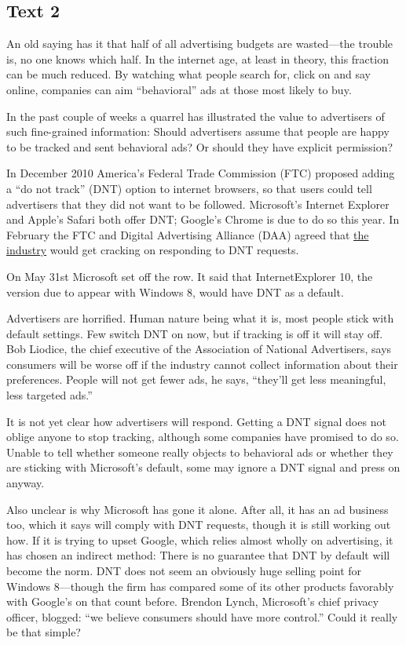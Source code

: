 \newpage
\subsection{Text 2}


An old saying has it that half of all advertising budgets are
wasted---the trouble is, no one knows which half. In the internet age,
at least in theory, this fraction can be much reduced. By watching what
people search for, click on and say online, companies can aim
``behavioral'' ads at those most likely to buy.

In the past couple of weeks a quarrel has illustrated the value to
advertisers of such fine-grained information: Should advertisers assume
that people are happy to be tracked and sent behavioral ads? Or should
they have explicit permission?

In December 2010 America's Federal Trade Commission (FTC) proposed
adding a ``do not track'' (DNT) option to internet browsers, so that
users could tell advertisers that they did not want to be followed.
Microsoft's Internet Explorer and Apple's Safari both offer DNT;
Google's Chrome is due to do so this year. In February the FTC and
Digital Advertising Alliance (DAA) agreed that \uline{the
	industry} would get cracking on responding to DNT requests.

On May 31st Microsoft set off the row. It said that InternetExplorer 10,
the version due to appear with Windows 8, would have DNT as a default.

Advertisers are horrified. Human nature being what it is, most people
stick with default settings. Few switch DNT on now, but if tracking is
off it will stay off. Bob Liodice, the chief executive of the
Association of National Advertisers, says consumers will be worse off if
the industry cannot collect information about their preferences. People
will not get fewer ads, he says, ``they'll get less meaningful, less
targeted ads.''

It is not yet clear how advertisers will respond. Getting a DNT signal
does not oblige anyone to stop tracking, although some companies have
promised to do so. Unable to tell whether someone really objects to
behavioral ads or whether they are sticking with Microsoft's default,
some may ignore a DNT signal and press on anyway.

Also unclear is why Microsoft has gone it alone. After all, it has an ad
business too, which it says will comply with DNT requests, though it is
still working out how. If it is trying to upset Google, which relies
almost wholly on advertising, it has chosen an indirect method: There is
no guarantee that DNT by default will become the norm. DNT does not seem
an obviously huge selling point for Windows 8---though the firm has
compared some of its other products favorably with Google's on that
count before. Brendon Lynch, Microsoft's chief privacy officer, blogged:
``we believe consumers should have more control.'' Could it really be
that simple?



